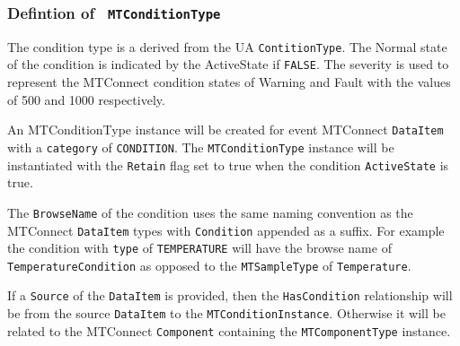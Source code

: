 \FloatBarrier




\subsubsection{Defintion of \texttt{ MTConditionType}}
  \label{type:MTConditionType}

\FloatBarrier

The condition type is a derived from the UA \texttt{ContitionType}. The Normal state of 
the condition is indicated by the ActiveState if \texttt{FALSE}. The severity 
is used to represent the MTConnect condition states of Warning and Fault with the values of
500 and 1000 respectively. 

An MTConditionType instance will be created for event MTConnect \texttt{DataItem} with a 
\texttt{category} of \texttt{CONDITION}. The \texttt{MTConditionType} instance will be instantiated 
with the \texttt{Retain} flag set to true when the condition \texttt{ActiveState} is true. 

The \texttt{BrowseName} of the condition uses the same naming convention as the  MTConnect
\texttt{DataItem} types with \texttt{Condition} appended as a suffix. For example the 
condition with \texttt{type} of \texttt{TEMPERATURE} will have the browse name of 
\texttt{TemperatureCondition} as opposed to the \texttt{MTSampleType} of \texttt{Temperature}.

If a \texttt{Source} of the \texttt{DataItem} is provided, then the \texttt{HasCondition} relationship 
will be from the source \texttt{DataItem} to the \texttt{MTConditionInstance}. Otherwise it will be 
related to the MTConnect \texttt{Component} containing the \texttt{MTComponentType} instance.


